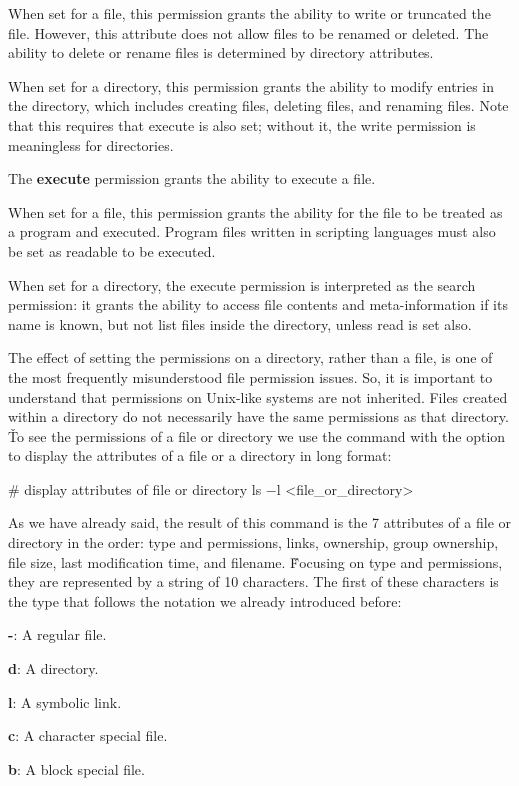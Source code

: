 \bit
\item When set for a file, this permission grants the ability to write or truncated the file. However, this attribute
does not allow files to be renamed or deleted. The ability to delete or rename files is determined by directory
attributes.
\item When set for a directory, this permission grants the ability to modify entries in the directory, which includes
creating files, deleting files, and renaming files. Note that this requires that execute is also set; without it, the
write permission is meaningless for directories.
\eit

The \textbf{execute} permission grants the ability to execute a file.
\ed

\bit
\item When set for a file, this permission grants the ability for the file to be treated as a program and executed.
Program files written in scripting languages must also be set as readable to be executed.
\item When set for a directory, the execute permission is interpreted as the search permission: it grants the ability to
access file contents and meta-information if its name is known, but not list files inside the directory, unless read is
set also.
\eit

The effect of setting the permissions on a directory, rather than a file, is one of the most frequently misunderstood
file permission issues. So, it is important to understand that permissions on Unix-like systems are not inherited.
Files created within a directory do not necessarily have the same permissions as that directory. \v

To see the permissions of a file or directory we use the  command with the option  to display
the attributes of a file or a directory in long format:
\begin{bash}
# display attributes of file or directory
ls $-$l <file_or_directory>
\end{bash}

As we have already said, the result of this command is the 7 attributes of a file or directory in the order: type and
permissions, links, ownership, group ownership, file size, last modification time, and filename. \v

Focusing on type and permissions, they are represented by a string of 10 characters. The first of these characters is
the type that follows the notation we already introduced before:
\bit
\item \textbf{-}: A regular file.
\item \textbf{d}: A directory.
\item \textbf{l}: A symbolic link.
\item \textbf{c}: A character special file.
\item \textbf{b}: A block special file.
\eit

